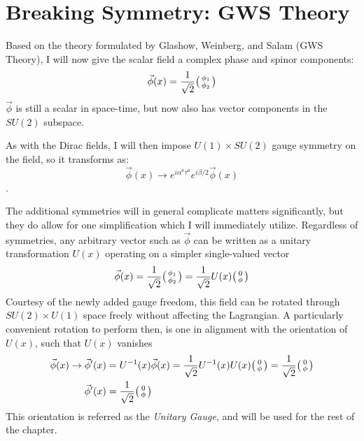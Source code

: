 \section{Breaking Symmetry: GWS Theory}

    Based on the theory formulated by Glashow, Weinberg, and Salam (GWS Theory),
        I will now give the scalar field a complex phase and spinor components:
    \begin{equation}
        \vec{\phi}(x) = \frac{1}{\sqrt{2}} \big(\begin{smallmatrix} \phi_1 \\ \phi_2 \end{smallmatrix}\big)
    \end{equation}
    $\vec{\phi}$ is still a scalar in space-time, but now also has vector components in the $SU(2)$ subspace.

    As with the Dirac fields, I will then impose $U(1) \times SU(2)$ gauge symmetry on the field, so it transforms as:
    \begin{equation}
        \vec{\phi}(x) \rightarrow e^{i \alpha^a \tau^a} e^{i \beta/2 } \vec{\phi}(x)
    \end{equation}.

    The additional symmetries will in general complicate matters significantly,
        but they do allow for one simplification which I will immediately utilize.
    Regardless of symmetries, any arbitrary vector such as $\vec{\phi}$ can be written as a unitary transformation $U(x)$ operating on a simpler single-valued vector
    \begin{equation}
        \vec{\phi}(x) = \frac{1}{\sqrt{2}} \big(\begin{smallmatrix} \phi_1 \\ \phi_2 \end{smallmatrix}\big) = \frac{1}{\sqrt{2}} U(x) \big(\begin{smallmatrix} 0 \\ \phi \end{smallmatrix}\big)
    \end{equation}
    Courtesy of the newly added gauge freedom, this field can be rotated through $SU(2) \times U(1)$ space freely without affecting the Lagrangian.
    A particularly convenient rotation to perform then, is one in alignment with the orientation of $U(x)$, such that $U(x)$ vanishes
    \begin{equation} \begin{split}
        \vec{\phi}(x) \rightarrow \vec{\phi}'(x) 
            &= U^{-1}(x) \vec{\phi}(x)
            = \frac{1}{\sqrt{2}} U^{-1}(x) U(x) \big(\begin{smallmatrix} 0 \\ \phi \end{smallmatrix}\big)
            = \frac{1}{\sqrt{2}} \big(\begin{smallmatrix} 0 \\ \phi \end{smallmatrix}\big) \\
        \vec{\phi}'(x) &= \frac{1}{\sqrt{2}} \big(\begin{smallmatrix} 0 \\ \phi \end{smallmatrix}\big)
    \end{split} \end{equation}
    This orientation is referred as the \textit{Unitary Gauge}, and will be used for the rest of the chapter.

